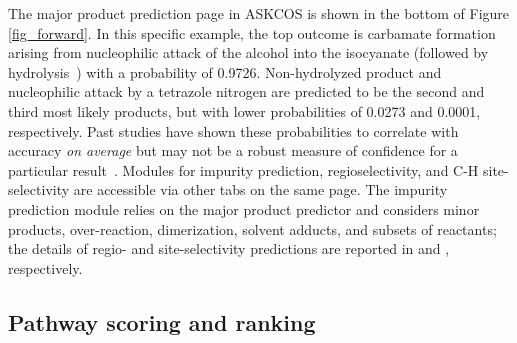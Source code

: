 \documentclass[pdflatex,sn-mathphys-num]{sn-jnl}%
\theoremstyle{thmstyleone}%
\theoremstyle{thmstyletwo}%
\theoremstyle{thmstylethree}%
\begin{document}
The major product prediction page in ASKCOS is shown in the bottom of Figure \ref{fig_forward}. In this specific example, the top outcome is carbamate formation arising from nucleophilic attack of the alcohol into the isocyanate (followed by hydrolysis~\citep{hirama_carbamate_1982}) with a probability of 0.9726. Non-hydrolyzed product and nucleophilic attack by a tetrazole nitrogen are predicted to be the second and third most likely products, but with lower probabilities of 0.0273 and 0.0001, respectively. Past studies have shown these probabilities to correlate with accuracy \emph{on average} but may not be a robust measure of confidence for a particular result~\citep{coley_graph-convolutional_2019,schwaller_molecular_2019,neves_global_2023}. Modules for impurity prediction, regioselectivity, and C-H site-selectivity are accessible via other tabs on the same page. The impurity prediction module relies on the major product predictor and considers minor products, over-reaction, dimerization, solvent adducts, and subsets of reactants; the details of regio- and site-selectivity predictions are reported in \citet{guan_regio-selectivity_2021} and \citet{struble_multitask_2020}, respectively.

\subsection{Pathway scoring and ranking}\label{results_pathway_analysis}
\end{document}
